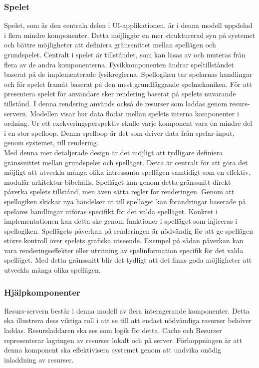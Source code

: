 \subsubsection{Spelet}
Spelet, som är den centrala delen i UI-applikationen, är i denna modell uppdelad i flera mindre komponenter. Detta möjliggör en mer strukturerad syn på systemet och bättre möjligheter att definiera gränssnittet mellan spellägen och grundspelet. Centralt i spelet är tillståndet, som kan läsas av och muteras från flera av de andra komponenterna. Fysikkomponenten ändrar speltillståndet baserat på de implementerade fysikreglerna. Spellogiken tar spelarnas handlingar och för spelet framåt baserat på den mest grundläggande spelmekaniken. För att presentera spelet för användare sker rendering baserat på spelets nuvarande tillstånd. I denna rendering används också de resurser som laddas genom resurs-servern. Modellen visar hur data flödar mellan spelets interna komponenter i ordning. Ur ett exekveringsperspektiv skulle varje komponent vara en mindre del i en stor spelloop. Denna spelloop är det som driver data från spelar-input, genom systemet, till rendering.\\

Med denna mer detaljerade design är det möjligt att tydligare definiera gränssnittet mellan grundspelet och spelläget. Detta är centralt för att göra det möjligt att utveckla många olika intressanta spellägen samtidigt som en effektiv, modulär arkitektur bibehålls. Spelläget kan genom detta gränssnitt direkt påverka spelets tillstånd, men även sätta regler för renderingen. Genom att spellogiken skickar nya händelser ut till spelläget kan förändringar baserade på spelares handlingar utföras specifikt för det valda spelläget. Konkret i implementationen kan detta ske genom funktioner i spelläget som injiceras i spellogiken. Spellägets påverkan på renderingen är nödvändig för att ge spellägen större kontroll över spelets grafiska utseende. Exempel på sådan påverkan kan vara renderingseffekter eller utritning av spelinformation specifik för det valda spelläget. Med detta gränssnitt blir det tydligt att det finns goda möjligheter att utveckla många olika spellägen.\\

\subsubsection{Hjälpkomponenter}
Resurs-servern består i denna modell av flera interagerande komponenter. Detta ska illustrera dess viktiga roll i att se till att endast nödvändiga resurser behöver laddas. Resursladdaren ska ses som logik för detta. Cache och Resurser representerar lagringen av resurser lokalt och på server. Förhoppningen är att denna komponent ska effektivisera systemet genom att undvika onödig inladdning av resurser.\\

